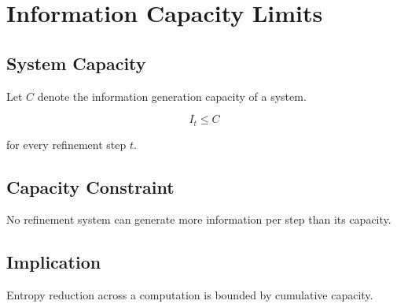 \chapter{Information Capacity Limits}

\section{System Capacity}

Let \(C\) denote the information generation capacity of a system.

\[
I_t \le C
\]

for every refinement step \(t\).

\section{Capacity Constraint}

\begin{theorem}
No refinement system can generate more information per step than its capacity.
\end{theorem}

\section{Implication}

Entropy reduction across a computation is bounded by cumulative capacity.
